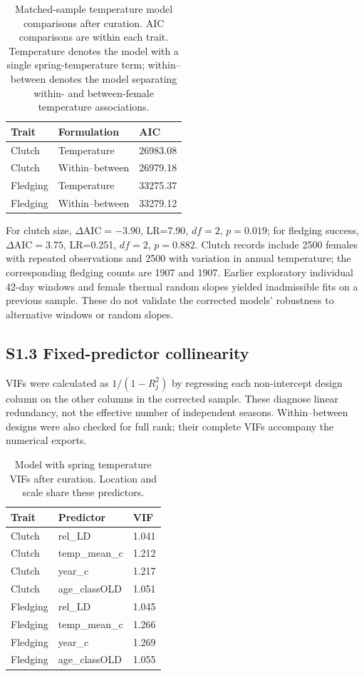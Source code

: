 \documentclass{article}
\begin{document}
\begin{table}[!ht]\centering\scriptsize\singlespacing
\caption{Matched-sample temperature model comparisons after curation. AIC comparisons are within each trait. Temperature denotes the model with a single spring-temperature term; within--between denotes the model separating within- and between-female temperature associations.}\label{tab:temperature-model-comparison}
\begin{tabular}{lll}\toprule
Trait & Formulation & AIC\\\midrule
Clutch & Temperature & 26983.08\\
Clutch & Within--between & 26979.18\\
Fledging & Temperature & 33275.37\\
Fledging & Within--between & 33279.12\\
\bottomrule\end{tabular}\end{table}
For clutch size, $\Delta\mathrm{AIC}=-3.90$, LR=7.90, $df=2$, $p=0.019$; for fledging success, $\Delta\mathrm{AIC}=3.75$, LR=0.251, $df=2$, $p=0.882$. Clutch records include 2500 females with repeated observations and 2500 with variation in annual temperature; the corresponding fledging counts are 1907 and 1907. Earlier exploratory individual 42-day windows and female thermal random slopes yielded inadmissible fits on a previous sample. These do not validate the corrected models' robustness to alternative windows or random slopes.

\subsection{S1.3 Fixed-predictor collinearity}

VIFs were calculated as $1/(1-R_j^2)$ by regressing each non-intercept design column on the other columns in the corrected sample. These diagnose linear redundancy, not the effective number of independent seasons. Within--between designs were also checked for full rank; their complete VIFs accompany the numerical exports.

\begin{table}[!ht]\centering\scriptsize\singlespacing
\caption{Model with spring temperature VIFs after curation. Location and scale share these predictors.}\label{tab:revised-vif}
\begin{tabular}{lll}\toprule
Trait & Predictor & VIF\\\midrule
Clutch & rel\_LD & 1.041\\
Clutch & temp\_mean\_c & 1.212\\
Clutch & year\_c & 1.217\\
Clutch & age\_classOLD & 1.051\\
Fledging & rel\_LD & 1.045\\
Fledging & temp\_mean\_c & 1.266\\
Fledging & year\_c & 1.269\\
Fledging & age\_classOLD & 1.055\\
\bottomrule\end{tabular}\end{table}
\end{document}
